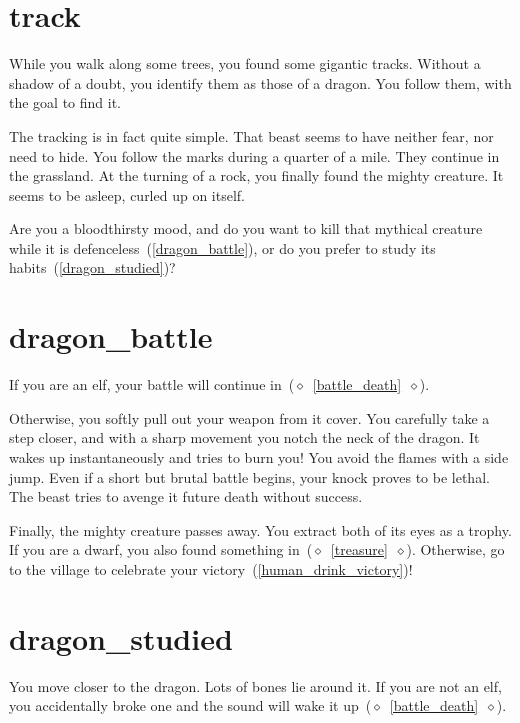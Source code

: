 \section{track}

While you walk along some trees, you found some gigantic tracks. Without a
shadow of a doubt, you identify them as those of a dragon. You follow them, with
the goal to find it.

The tracking is in fact quite simple. That beast seems to have neither fear, nor
need to hide. You follow the marks during a quarter of a mile. They continue in
the grassland. At the turning of a rock, you finally found the mighty creature.
It seems to be asleep, curled up on itself.

Are you a bloodthirsty mood, and do you want to kill that mythical creature while it
is defenceless~(\ref{dragon_battle}), or do you prefer to study its
habits~(\ref{dragon_studied})?

\section{dragon_battle}

If you are an elf, your battle will continue
in~($\diamond$~\ref{battle_death}~$\diamond$).

\medbreak

Otherwise, you softly pull out your weapon from it cover. You carefully take a
step closer, and with a sharp movement you notch the neck of the dragon. It wakes
up instantaneously and tries to burn you! You avoid the flames with a side jump.
Even if a short but brutal battle begins, your knock proves to be lethal. The
beast tries to avenge it future death without success.

Finally, the mighty creature passes away. You extract both of its eyes as a
trophy. If you are a dwarf, you also found something
in~($\diamond$~\ref{treasure}~$\diamond$).
Otherwise, go to the village to celebrate your
victory~(\ref{human_drink_victory})!

\section{dragon_studied}

You move closer to the dragon. Lots of bones lie around it. If you are not an
elf, you accidentally broke one and the sound will wake it
up~($\diamond$~\ref{battle_death}~$\diamond$).

\medbreak

